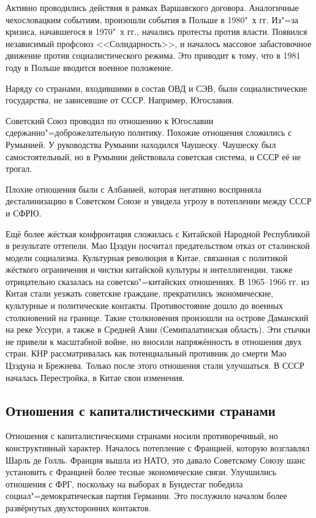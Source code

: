     Активно проводились действия в рамках Варшавского договора. Аналогичные чехословацким событиям, произошли события в Польше в 1980"~х гг. Из"=за кризиса, начавшегося в 1970"~х гг., начались протесты против власти. Появился независимый профсоюз <<Солидарность>>, и началось массовое забастовочное движение против социалистического режима. Это приводит к тому, что в 1981 году в Польше вводится военное положение.

    Наряду со странами, входившими в состав ОВД и СЭВ, были социалистические государства, не зависевшие от СССР. Например, Югославия.

    Советский Союз проводил по отношению к Югославии сдержанно"=доброжелательную политику. Похожие отношения сложились с Румынией. У руководства Румынии находился Чаушеску. Чаушеску был самостоятельный, но в Румынии действовала советская система, и СССР её не трогал.
    
    Плохие отношения были с Албанией, которая негативно восприняла десталинизацию в Советском Союзе и увидела угрозу в потеплении между СССР и СФРЮ.
    
    Ещё более жёсткая конфронтация сложилась с Китайской Народной Республикой в результате оттепели. Мао Цзэдун посчитал предательством отказ от сталинской модели социализма. Культурная революция в Китае, связанная с политикой жёсткого ограничения и чистки китайской культуры и интеллигенции, также отрицательно сказалась на советско"=китайских отношениях. В 1965--1966 гг. из Китая стали уезжать советские граждане, прекратились экономические, культурные и политические контакты. Противостояние дошло до военных столкновений на границе. Такие столкновения произошли на острове Даманский на реке Уссури, а также в Средней Азии (Семипалатинская область). Эти стычки не привели к масштабной войне, но вносили напряжённость в отношения двух стран. КНР рассматривалась как потенциальный противник до смерти Мао Цзэдуна и Брежнева. Только после этого отношения стали улучшаться. В СССР началась Перестройка, в Китае свои изменения.

    \subsection{Отношения с капиталистическими странами}
    
    Отношения с капиталистическими странами носили противоречивый, но конструктивный характер. Началось потепление с Францией, которую возглавлял Шарль де Голль. Франция вышла из НАТО, это давало Советскому Союзу шанс установить с Францией более тесные экономические связи. Улучшились отношения с ФРГ, поскольку на выборах в Бундестаг победила социал"=демократическая партия Германии. Это послужило началом более развёрнутых двухсторонних контактов.
    

